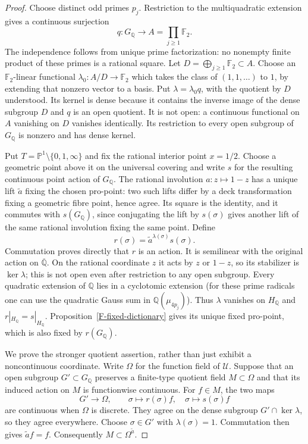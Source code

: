 \begin{proof}
Choose distinct odd primes $p_j$. Restriction to the
multiquadratic extension gives a continuous surjection
\[
 q:G_{\mathbb Q}\longrightarrow
                  A=\prod_{j\ge1}\mathbb F_2.
\]
The independence follows from unique prime factorization:
no nonempty finite product of these primes is a rational
square. Let $D=\bigoplus_{j\ge1}\mathbb F_2\subset A$.
Choose an $\mathbb F_2$-linear functional
$\lambda_0:A/D\to\mathbb F_2$ which takes the class of
$(1,1,\ldots)$ to $1$, by extending that nonzero vector
to a basis. Put $\lambda=\lambda_0q$, with the quotient
by $D$ understood. Its kernel is dense because it contains
the inverse image of the dense subgroup $D$ and $q$ is
an open quotient. It is not open: a continuous functional
on $A$ vanishing on $D$ vanishes identically. Its
restriction to every open subgroup of $G_{\mathbb Q}$
is nonzero and has dense kernel.

Put $T=\mathbb P^1\setminus\{0,1,\infty\}$ and fix the
rational interior point $x=1/2$. Choose a geometric point
above it on the universal covering and write $s$ for the
resulting continuous point action of $G_{\mathbb Q}$.
The rational involution $a:z\mapsto1-z$ has a unique lift
$\widetilde a$ fixing the chosen pro-point: two such lifts
differ by a deck transformation fixing a geometric fibre
point, hence agree. Its square is the identity, and it
commutes with $s(G_{\mathbb Q})$, since conjugating the
lift by $s(\sigma)$ gives another lift of the same rational
involution fixing the same point. Define
\[
 r(\sigma)=\widetilde a^{\lambda(\sigma)}s(\sigma).
\]
Commutation proves directly that $r$ is an action. It is
semilinear with the original action on $\overline{\mathbb Q}$.
On the rational coordinate $z$ it acts by $z$ or $1-z$,
so its stabilizer is $\ker\lambda$; this is not open even
after restriction to any open subgroup. Every quadratic
extension of $\mathbb Q$ lies in a cyclotomic extension
(for these prime radicals one can use the quadratic Gauss
sum in $\mathbb Q(\mu_{4p_j})$). Thus $\lambda$ vanishes
on $H_{\mathbb Q}$ and $r|_{H_{\mathbb Q}}=s|_{H_{\mathbb Q}}$.
Proposition~\ref{F-fixed-dictionary} gives its unique fixed
pro-point, which is also fixed by $r(G_{\mathbb Q})$.

We prove the stronger quotient assertion, rather than
just exhibit a noncontinuous coordinate. Write $\Omega$
for the function field of $\mathcal U$. Suppose that an
open subgroup $G'\subset G_{\mathbb Q}$ preserves a
finite-type quotient field $M\subset\Omega$ and that
its induced action on $M$ is functionwise continuous.
For $f\in M$, the two maps
\[
 G'\longrightarrow\Omega,\qquad
 \sigma\longmapsto r(\sigma)f,\quad
 \sigma\longmapsto s(\sigma)f
\]
are continuous when $\Omega$ is discrete. They agree on
the dense subgroup $G'\cap\ker\lambda$, so they agree
everywhere. Choose $\sigma\in G'$ with $\lambda(\sigma)=1$.
Commutation then gives $\widetilde a f=f$. Consequently
$M\subset\Omega^{\widetilde a}$.


\end{proof}
